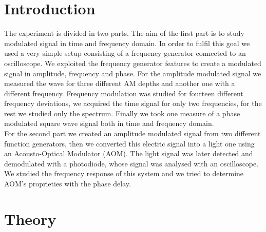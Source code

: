 \documentclass[a4paper,10pt]{article}
\begin{document}
\section{Introduction}
The experiment is divided in two parts. The aim of the first part is to study modulated signal in time and frequency domain. In order to fulfil this goal we used a very simple setup consisting of a frequency generator connected to an oscilloscope. We exploited the frequency generator features to create a modulated signal in amplitude, frequency and phase. 
For the amplitude modulated signal we measured the wave for three different AM depths and another one with a different frequency. Frequency modulation was studied for fourteen different frequency deviations, we acquired the time signal for only two frequencies, for the rest we studied only the spectrum. Finally we took one measure of a phase modulated square wave signal both in time and frequency domain.\\
For the second part we created an amplitude modulated signal from two different function generators, then we converted this electric signal into a light one using an Acousto-Optical Modulator (AOM). The light signal was later detected and demodulated with a photodiode, whose signal was analysed with an oscilloscope. We studied the frequency response of this system and we tried to determine AOM's proprieties with the phase delay.
\section{Theory}
\end{document}
